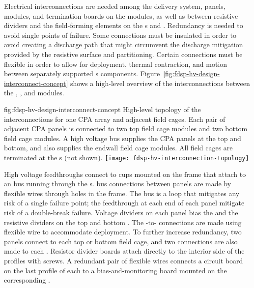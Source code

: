 Electrical interconnections are needed among the  delivery system,  panels,  modules, and termination
boards on the  modules, as well as between resistive dividers and
the field-forming elements on the s and .  %
Redundancy is
needed to avoid single points of failure. 
Some connections must be
insulated in order to avoid creating a discharge path that might
circumvent the discharge mitigation provided by the resistive 
surface and  partitioning.  Certain connections must be
flexible in order to allow for  deployment, thermal
contraction, and motion between separately supported s components.  Figure~\ref{fig:fdsp-hv-design-interconnect-concept} shows a high-level
overview of the interconnections between the , , and  modules.

\begin{dunefigure}{fig:fdsp-hv-design-interconnect-concept}
  {High-level topology of the  interconnections for one CPA array and adjacent field cages. Each pair of adjacent CPA panels is connected to two top field cage modules and two bottom field cage modules. A high voltage bus supplies the CPA panels at the top and bottom, and also supplies the endwall field cage modules. All field cages are terminated at the s (not shown).}
  \texttt{[image: fdsp-hv-interconnection-topology]}
\end{dunefigure}

High voltage feedthroughs connect to cups mounted on the  frame
that attach to an  bus running through the s.   bus connections
between  panels are made by flexible wires through holes in the
 frame. The  bus is a loop that mitigates any risk of a single
failure point; the feedthrough at each end of each  panel mitigate
risk of a double-break failure.  Voltage dividers on each  panel
bias the  and the resistive dividers on the top
and bottom .  The -to- connections are made using
flexible wire to accommodate  deployment.  To further
increase redundancy, two  panels connect to each top or bottom
field cage, and two connections are also made to each . Resistor divider boards attach directly to the interior side of
the  profiles with screws.   A redundant pair of flexible wires
connects a circuit board on the last profile of each  to a
bias-and-monitoring board mounted on the corresponding .

